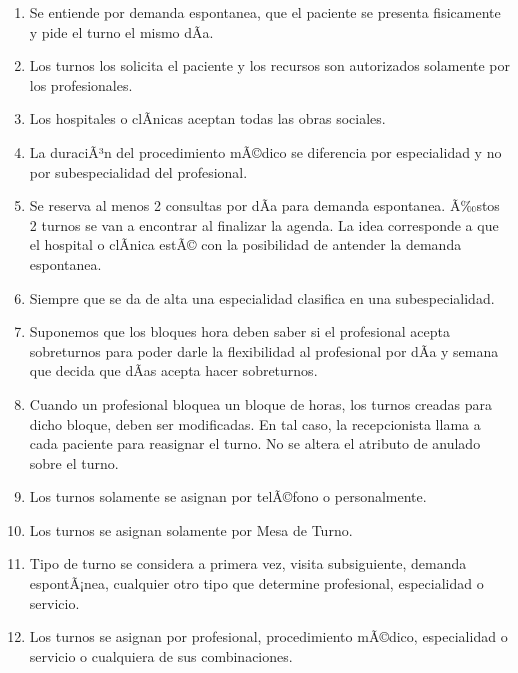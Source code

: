 \documentclass[a4paper,11pt]{article}
\begin{document}
\begin{enumerate}

    \item Se entiende por demanda espontanea, que el paciente se presenta 
    fisicamente y pide el turno el mismo dÃ­a.
    
    \item Los turnos los solicita el paciente y los recursos son autorizados 
    solamente por los profesionales.
    
    \item Los hospitales o clÃ­nicas aceptan todas las obras sociales.
    
    \item La duraciÃ³n del procedimiento mÃ©dico se diferencia por especialidad
    y no por subespecialidad del profesional.
    
    \item Se reserva al menos 2 consultas por dÃ­a para demanda espontanea.
    Ã‰stos 2 turnos se van a encontrar al finalizar la agenda. La idea corresponde
    a que el hospital o clÃ­nica estÃ© con la posibilidad de antender la demanda
    espontanea.
    
    \item Siempre que se da de alta una especialidad clasifica en una subespecialidad.
    
    \item Suponemos que los bloques hora deben saber si el profesional acepta 
    sobreturnos para poder darle la flexibilidad al profesional por dÃ­a y semana 
    que decida que dÃ­as acepta hacer sobreturnos.
    
    \item Cuando un profesional bloquea un bloque de horas, los turnos creadas 
    para dicho bloque, deben ser modificadas. En tal caso, la recepcionista llama
    a cada paciente para reasignar el turno. No se altera el atributo de anulado 
    sobre el turno.
    
    \item Los turnos solamente se asignan por telÃ©fono o personalmente.
    
    \item Los turnos se asignan solamente por Mesa de Turno.
    
    \item Tipo de turno se considera a primera vez, visita subsiguiente, demanda 
    espontÃ¡nea, cualquier otro 
    tipo que determine profesional, especialidad o servicio.
    
    \item Los turnos se asignan por profesional, procedimiento mÃ©dico, especialidad
    o servicio o cualquiera de sus combinaciones.
    

\end{enumerate}
\end{document}

